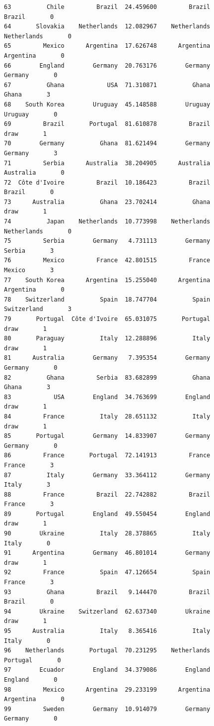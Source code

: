\documentclass[12pt,fleqn]{article}\usepackage{../common}
\begin{document}
\begin{verbatim}
63          Chile         Brazil  24.459600         Brazil         Brazil       0
64       Slovakia    Netherlands  12.082967    Netherlands    Netherlands       0
65         Mexico      Argentina  17.626748      Argentina      Argentina       0
66        England        Germany  20.763176        Germany        Germany       0
67          Ghana            USA  71.310871          Ghana          Ghana       3
68    South Korea        Uruguay  45.148588        Uruguay        Uruguay       0
69         Brazil       Portugal  81.610878         Brazil           draw       1
70        Germany          Ghana  81.621494        Germany        Germany       3
71         Serbia      Australia  38.204905      Australia      Australia       0
72  Côte d'Ivoire         Brazil  10.186423         Brazil         Brazil       0
73      Australia          Ghana  23.702414          Ghana           draw       1
74          Japan    Netherlands  10.773998    Netherlands    Netherlands       0
75         Serbia        Germany   4.731113        Germany         Serbia       3
76         Mexico         France  42.801515         France         Mexico       3
77    South Korea      Argentina  15.255040      Argentina      Argentina       0
78    Switzerland          Spain  18.747704          Spain    Switzerland       3
79       Portugal  Côte d'Ivoire  65.031075       Portugal           draw       1
80       Paraguay          Italy  12.288896          Italy           draw       1
81      Australia        Germany   7.395354        Germany        Germany       0
82          Ghana         Serbia  83.682899          Ghana          Ghana       3
83            USA        England  34.763699        England           draw       1
84         France          Italy  28.651132          Italy           draw       1
85       Portugal        Germany  14.833907        Germany        Germany       0
86         France       Portugal  72.141913         France         France       3
87          Italy        Germany  33.364112        Germany          Italy       3
88         France         Brazil  22.742882         Brazil         France       3
89       Portugal        England  49.550454        England           draw       1
90        Ukraine          Italy  28.378865          Italy          Italy       0
91      Argentina        Germany  46.801014        Germany           draw       1
92         France          Spain  47.126654          Spain         France       3
93          Ghana         Brazil   9.144470         Brazil         Brazil       0
94        Ukraine    Switzerland  62.637340        Ukraine           draw       1
95      Australia          Italy   8.365416          Italy          Italy       0
96    Netherlands       Portugal  70.231295    Netherlands       Portugal       0
97        Ecuador        England  34.379086        England        England       0
98         Mexico      Argentina  29.233199      Argentina      Argentina       0
99         Sweden        Germany  10.914079        Germany        Germany       0
\end{verbatim}
\end{document}
